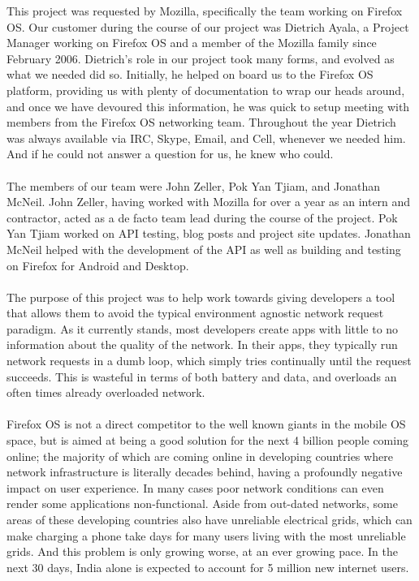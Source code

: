 \documentclass[12pt]{article}
\begin{document}
This project was requested by Mozilla, specifically the team working on Firefox OS. Our customer during the course of our project was Dietrich Ayala, a Project Manager working on Firefox OS and a member of the Mozilla family since February 2006. Dietrich's role in our project took many forms, and evolved as what we needed did so. Initially, he helped on board us to the Firefox OS platform, providing us with plenty of documentation to wrap our heads around, and once we have devoured this information, he was quick to setup meeting with members from the Firefox OS networking team. Throughout the year Dietrich was always available via IRC, Skype, Email, and Cell, whenever we needed him. And if he could not answer a question for us, he knew who could.
\\\\
The members of our team were John Zeller, Pok Yan Tjiam, and Jonathan McNeil. John Zeller, having worked with Mozilla for over a year as an intern and contractor, acted as a de facto team lead during the course of the project. Pok Yan Tjiam worked on API testing, blog posts and project site updates. Jonathan McNeil helped with the development of the API as well as building and testing on Firefox for Android and Desktop.
\\\\
The purpose of this project was to help work towards giving developers a tool that allows them to avoid the typical environment agnostic network request paradigm. As it currently stands, most developers create apps with little to no information about the quality of the network. In their apps, they typically run network requests in a dumb loop, which simply tries continually until the request succeeds. This is wasteful in terms of both battery and data, and overloads an often times already overloaded network.
\\\\
Firefox OS is not a direct competitor to the well known giants in the mobile OS space, but is aimed at being a good solution for the next 4 billion people coming online; the majority of which are coming online in developing countries where network infrastructure is literally decades behind, having a profoundly negative impact on user experience. In many cases poor network conditions can even render some applications non-functional. Aside from out-dated networks, some areas of these developing countries also have unreliable electrical grids, which can make charging a phone take days for many users living with the most unreliable grids. And this problem is only growing worse, at an ever growing pace. In the next 30 days, India alone is expected to account for 5 million new internet users.
\pagebreak
\end{document}

